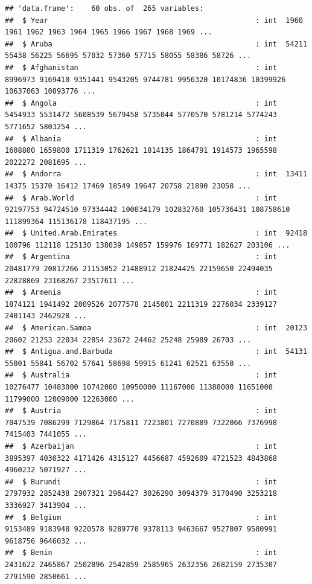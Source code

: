 \documentclass[12pt,]{article}
\begin{document}
\begin{verbatim}
## 'data.frame':    60 obs. of  265 variables:
##  $ Year                                                : int  1960 1961 1962 1963 1964 1965 1966 1967 1968 1969 ...
##  $ Aruba                                               : int  54211 55438 56225 56695 57032 57360 57715 58055 58386 58726 ...
##  $ Afghanistan                                         : int  8996973 9169410 9351441 9543205 9744781 9956320 10174836 10399926 10637063 10893776 ...
##  $ Angola                                              : int  5454933 5531472 5608539 5679458 5735044 5770570 5781214 5774243 5771652 5803254 ...
##  $ Albania                                             : int  1608800 1659800 1711319 1762621 1814135 1864791 1914573 1965598 2022272 2081695 ...
##  $ Andorra                                             : int  13411 14375 15370 16412 17469 18549 19647 20758 21890 23058 ...
##  $ Arab.World                                          : int  92197753 94724510 97334442 100034179 102832760 105736431 108758610 111899364 115136178 118437195 ...
##  $ United.Arab.Emirates                                : int  92418 100796 112118 125130 138039 149857 159976 169771 182627 203106 ...
##  $ Argentina                                           : int  20481779 20817266 21153052 21488912 21824425 22159650 22494035 22828869 23168267 23517611 ...
##  $ Armenia                                             : int  1874121 1941492 2009526 2077578 2145001 2211319 2276034 2339127 2401143 2462928 ...
##  $ American.Samoa                                      : int  20123 20602 21253 22034 22854 23672 24462 25248 25989 26703 ...
##  $ Antigua.and.Barbuda                                 : int  54131 55001 55841 56702 57641 58698 59915 61241 62521 63550 ...
##  $ Australia                                           : int  10276477 10483000 10742000 10950000 11167000 11388000 11651000 11799000 12009000 12263000 ...
##  $ Austria                                             : int  7047539 7086299 7129864 7175811 7223801 7270889 7322066 7376998 7415403 7441055 ...
##  $ Azerbaijan                                          : int  3895397 4030322 4171426 4315127 4456687 4592609 4721523 4843868 4960232 5071927 ...
##  $ Burundi                                             : int  2797932 2852438 2907321 2964427 3026290 3094379 3170490 3253218 3336927 3413904 ...
##  $ Belgium                                             : int  9153489 9183948 9220578 9289770 9378113 9463667 9527807 9580991 9618756 9646032 ...
##  $ Benin                                               : int  2431622 2465867 2502896 2542859 2585965 2632356 2682159 2735307 2791590 2850661 ...

\end{verbatim}
\end{document}
